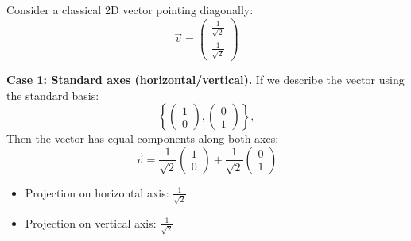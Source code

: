 \highspace
\begin{examplebox}\label{ex:measurement-projection}
    Consider a classical 2D vector pointing diagonally:
    \begin{equation*}
        \vec{v} = \begin{pmatrix} \frac{1}{\sqrt{2}} \\ \frac{1}{\sqrt{2}} \end{pmatrix}
    \end{equation*}

    \highspace
    \textbf{Case 1: Standard axes (horizontal/vertical).} If we describe the vector using the standard basis:
    \begin{equation*}
        \left\{ \begin{pmatrix}1 \\ 0\end{pmatrix}, \begin{pmatrix}0 \\ 1\end{pmatrix} \right\},
    \end{equation*}
    Then the vector has equal components along both axes:
    \begin{equation*}
        \vec{v} = \frac{1}{\sqrt{2}} \begin{pmatrix}1 \\ 0\end{pmatrix}
        + \frac{1}{\sqrt{2}} \begin{pmatrix}0 \\ 1\end{pmatrix}
    \end{equation*}
    \begin{itemize}
        \item Projection on horizontal axis: $\frac{1}{\sqrt{2}}$
        \item Projection on vertical axis: $\frac{1}{\sqrt{2}}$
    \end{itemize}


\end{examplebox}
